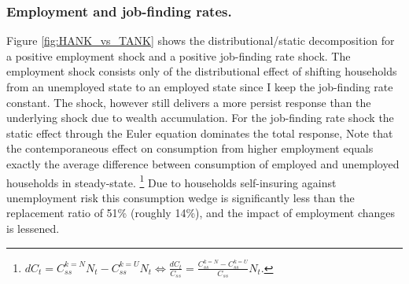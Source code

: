 \subsubsection{Employment and job-finding rates.}  Figure \ref{fig:HANK_vs_TANK} shows the distributional/static decomposition for a positive employment shock and a positive job-finding rate shock. The employment shock consists only of the distributional effect of shifting households from an unemployed state to an employed state since I keep the job-finding rate constant. The shock, however still delivers a more persist response than the underlying shock due to wealth accumulation. For the job-finding rate shock the static effect through the Euler equation dominates the total response, 
Note that the contemporaneous effect on consumption from higher employment equals exactly the average difference between consumption of employed and unemployed households in steady-state. \footnote{$dC_{t}=C_{ss}^{k=N}N_{t}-C_{ss}^{k=U}N_{t}\Leftrightarrow\frac{dC_{t}}{C_{ss}}=\frac{C_{ss}^{k=N}-C_{ss}^{k=U}}{C_{ss}}N_{t}$.} Due to households self-insuring against unemployment risk this consumption wedge is significantly less than the replacement ratio of 51\% (roughly 14\%), and the impact of employment changes is lessened. 




